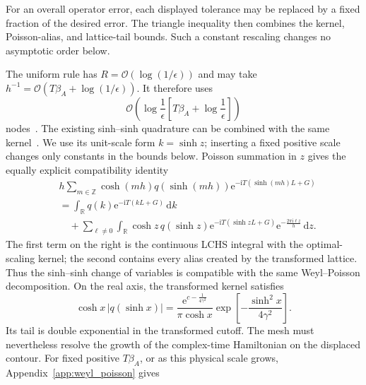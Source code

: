 \documentclass[aps,pra,reprint,floatfix,unsortedaddress,superscriptaddress]{revtex4-2}
\newcommand{\abs}[1]{\left\lvert#1\right\rvert}
\newcommand{\Ocal}{\mathcal{O}}
\begin{document}
For an overall operator error, each displayed tolerance may be replaced
by a fixed fraction of the desired error.  The triangle inequality then
combines the kernel, Poisson-alias, and lattice-tail bounds.  Such a
constant rescaling changes no asymptotic order below.

The uniform rule has $R=\Ocal(\log(1/\epsilon))$ and may take
$h^{-1}=\Ocal(T\beta_A+\log(1/\epsilon))$.  It therefore uses
\begin{equation}
    \Ocal\!\left(
        \log\frac{1}{\epsilon}
        \left[T\beta_A+\log\frac{1}{\epsilon}\right]
    \right)
    \label{eq:uniform_lchs_nodes}
\end{equation}
    nodes~\cite{low2025optimalquantumsimulationlinear,
    trefethen2014exponentially}.  The existing sinh--sinh quadrature can
    be combined with the same kernel~\cite{mori2005discovery,
    ooura2005double,sugihara1997optimality,okayama2022double,
    aftab2026lchsmpf}.  We use its unit-scale form $k=\sinh z$; inserting
a fixed positive scale changes only constants in the bounds below.
Poisson summation in $z$ gives the equally explicit compatibility
identity
\begin{align}
    &h\sum_{m\in\mathbb Z}
    \cosh(mh)q(\sinh(mh))
    \mathrm e^{-\mathrm iT(\sinh(mh)L+G)}
    \nonumber\\
    &=
    \int_{\mathbb R}q(k)
    \mathrm e^{-\mathrm iT(kL+G)}\,\mathrm dk
    \nonumber\\
    &\quad+
    \sum_{\ell\ne0}
    \int_{\mathbb R}
    \cosh z\,q(\sinh z)
    \mathrm e^{-\mathrm iT(\sinh zL+G)}
    \mathrm e^{-\frac{2\pi\mathrm i\ell z}{h}}\,\mathrm dz.
    \label{eq:sinh_weyl_poisson}
\end{align}
The first term on the right is the continuous LCHS integral with the
optimal-scaling kernel; the second contains every alias created by the
transformed lattice.
Thus the sinh--sinh change of variables is compatible with the same
Weyl--Poisson decomposition.  On the
real axis, the transformed kernel satisfies
\begin{equation}
    \cosh x\,\abs{q(\sinh x)}
    =
    \frac{\mathrm e^{c-\frac{1}{4\gamma^2}}}{\pi\cosh x}
    \exp\!\left[-\frac{\sinh^2x}{4\gamma^2}\right].
    \label{eq:sinh_optimal_kernel_decay}
\end{equation}
Its tail is double exponential in the transformed cutoff.  The mesh
must nevertheless resolve the growth of the complex-time Hamiltonian
on the displaced contour.  For fixed positive $T\beta_A$, or as this
physical scale grows, Appendix~\ref{app:weyl_poisson} gives
\end{document}

